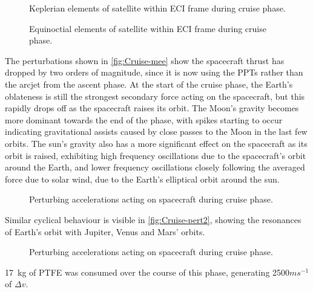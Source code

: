 \begin{figure}
\centering
\def\svgwidth{\figurewidth}

\caption{Keplerian elements of satellite within ECI frame during cruise phase.}
\label{fig:Cruise-kep}
\end{figure}

\begin{figure}
\centering
\def\svgwidth{\figurewidth}

\caption{Equinoctial elements of satellite within ECI frame during cruise phase.}
\label{fig:Cruise-mee}
\end{figure}

The perturbations shown in \autoref{fig:Cruise-mee} show the spacecraft thrust has dropped by two orders of magnitude, since it is now using the PPTs rather than the arcjet from the ascent phase. At the start of the cruise phase, the Earth's oblateness is still the strongest secondary force acting on the spacecraft, but this rapidly drops off as the spacecraft raises its orbit. The Moon's gravity becomes more dominant towards the end of the phase, with spikes starting to occur indicating gravitational assists caused by close passes to the Moon in the last few orbits. The sun's gravity also has a more significant effect on the spacecraft as its orbit is raised, exhibiting high frequency oscillations due to the spacecraft's orbit around the Earth, and lower frequency oscillations closely following the averaged force due to solar wind, due to the Earth's elliptical orbit around the sun.

\begin{figure}
\centering
\def\svgwidth{\figurewidth}

\caption{Perturbing accelerations acting on spacecraft during cruise phase.}
\label{fig:Cruise-pert}
\end{figure}

Similar cyclical behaviour is visible in \autoref{fig:Cruise-pert2}, showing the resonances of Earth's orbit with Jupiter, Venus and Mars' orbits.

\begin{figure}
\centering
\def\svgwidth{\figurewidth}

\caption{Perturbing accelerations acting on spacecraft during cruise phase.}
\label{fig:Cruise-pert2}
\end{figure}

17~kg of PTFE was consumed over the course of this phase, generating 2500$ms^{-1}$ of $\Delta v$. %


